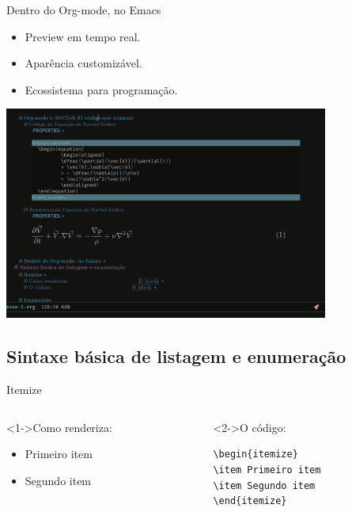\documentclass[bigger]{beamer}
\begin{document}
{\begin{frame}[label={sec:orgd966b97}]{Dentro do Org-mode, no Emacs}
\begin{itemize}[<+->]
\item Preview em tempo real.
\item Aparência customizável.
\item Ecossistema para programação.
\end{itemize}

\href{img/orgmode-auctex.png}{\includegraphics[center,width=0.8\textwidth]{./img/orgmode-auctex2.png}}
\end{frame}

\subsection{Sintaxe básica de listagem e enumeração}
\label{sec:org7bae3a4}
\begin{frame}[label={sec:orgce5784e},fragile]{Itemize}
 \begin{columns}
\begin{column}{0.48\columnwidth}
\begin{block}<1->{Como renderiza:}
\begin{itemize}
\item Primeiro item
\item Segundo item
\end{itemize}
\end{block}
\end{column}

\begin{column}{0.48\columnwidth}
\begin{block}<2->{O código:}
\begin{verbatim}
\begin{itemize}
\item Primeiro item
\item Segundo item
\end{itemize}
\end{verbatim}
\end{block}
\end{column}
\end{columns}
\end{frame}

}
\end{document}
